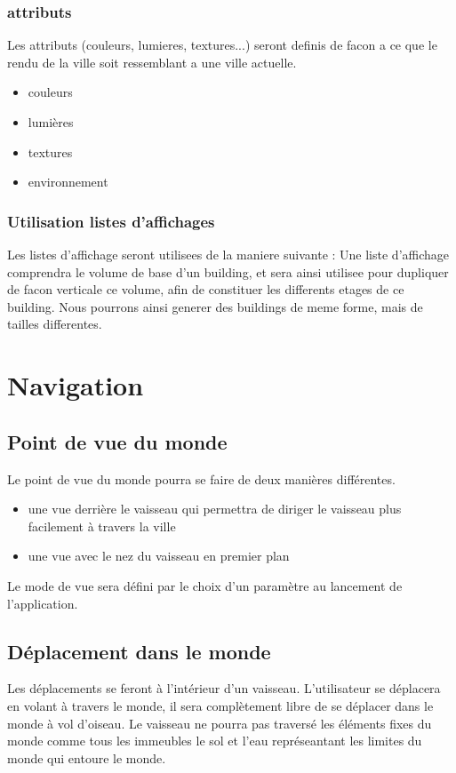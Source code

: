 \documentclass[a4paper,12pt]{article}
\begin{document}
\subsubsection{attributs}
Les attributs (couleurs, lumieres, textures...) seront definis de facon a ce que le rendu de la ville soit ressemblant a une ville actuelle. 
\begin{itemize}
\item couleurs
\item lumières
\item textures
\item environnement
\end{itemize}

\subsubsection{Utilisation listes d'affichages}

Les listes d'affichage seront utilisees de la maniere suivante : 
    Une liste d'affichage comprendra le volume de base d'un building, et sera ainsi utilisee pour dupliquer de facon verticale ce volume, afin de constituer les differents etages de ce building.  Nous pourrons ainsi generer des buildings de meme forme, mais de tailles differentes. 
\section{Navigation}

\subsection{Point de vue du monde}
Le point de vue du monde pourra se faire de deux manières différentes.

\begin{itemize}
\item une vue derrière le vaisseau qui permettra de diriger le vaisseau plus facilement à travers la ville
\item une vue avec le nez du vaisseau en premier plan
\end{itemize}

Le mode de vue sera défini par le choix d'un paramètre au lancement de l'application.

\subsection{Déplacement dans le monde}
    
Les déplacements se feront à l'intérieur d'un vaisseau. L'utilisateur se déplacera en volant à travers le monde, il sera complètement libre de se déplacer dans le monde à vol d'oiseau. 
Le vaisseau ne pourra pas traversé les éléments fixes du monde comme tous les immeubles le sol et l'eau représeantant les limites du monde qui entoure le monde.
 
\end{document}
